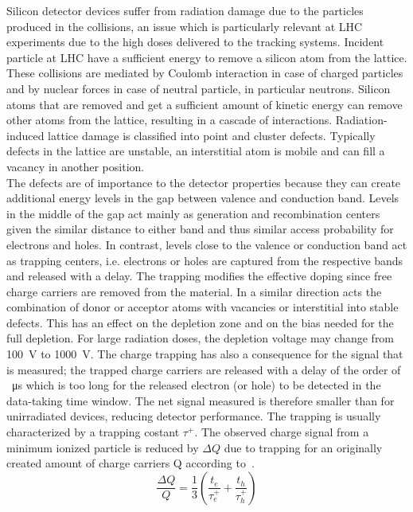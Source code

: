 Silicon detector devices suffer from radiation damage due to the particles produced in the collisions, an issue which is particularly relevant at LHC experiments due to the high doses delivered to the tracking systems.
Incident particle at LHC have a sufficient energy to remove a silicon atom from the lattice. These collisions are mediated by Coulomb interaction in case of charged particles and by nuclear forces in case of neutral particle, in particular neutrons. Silicon atoms that are removed and get a sufficient amount of kinetic energy can remove other atoms from the lattice, resulting in a cascade of interactions.
Radiation-induced lattice damage is classified into point and cluster defects. Typically defects in the lattice are unstable, an interstitial atom is mobile and can fill a vacancy in another position.\\
The defects are of importance to the detector properties because they can create additional energy levels in the gap between valence and conduction band. Levels in the middle of the gap act mainly as generation and recombination centers given the similar distance to either band and thus similar access probability for electrons and holes. In contrast, levels close to the valence or conduction band act as trapping centers, i.e. electrons or holes are captured from the respective bands and released with a delay.
The trapping modifies the effective doping since free charge carriers are removed from the material. In a similar direction acts the combination of donor or acceptor atoms with vacancies or interstitial into stable defects. This has an effect on the depletion zone and on the bias needed for the full depletion. For large radiation doses, the depletion voltage may change from \SI{100}{\volt} to \SI{1000}{\volt}.
The charge trapping has also a consequence for the signal that is measured; the trapped charge carriers are released with a delay of the order of \SI{}{\micro\second} which is too long for the released electron (or hole) to be detected in the data-taking time window. The net signal measured is therefore smaller than for unirradiated devices, reducing detector performance. The trapping is usually characterized by a trapping costant $\tau^+$. The observed charge signal from a minimum ionized particle is reduced by $\Delta Q$ due to trapping for an originally created amount of charge carriers Q according to~\cite{moll}.
\begin{equation}
\frac{\Delta Q}{Q}=\frac{1}{3}(\frac{t_e}{\tau^+_e}+\frac{t_h}{\tau^+_h})
\end{equation}
